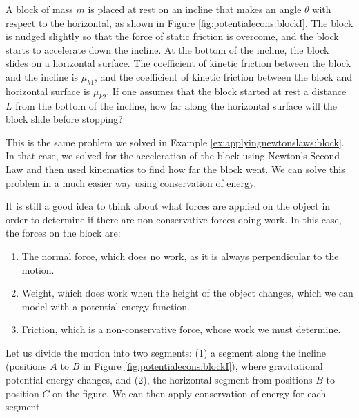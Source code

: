 \begin{example}{\label{ex:potentialecons:blockI}
A block of mass $m$ is placed at rest on an incline that makes an angle $\theta$ with respect to the horizontal, as shown in Figure \ref{fig:potentialecons:blockI}. The block is nudged slightly so that the force of static friction is overcome, and the block starts to accelerate down the incline. At the bottom of the incline, the block slides on a horizontal surface. 
The coefficient of kinetic friction between the block and the incline is $\mu_{k1}$, and the coefficient of kinetic friction between the block and horizontal surface is $\mu_{k2}$. If one assumes that the block started at rest a distance $L$ from the bottom of the incline, how far along the horizontal surface will the block slide before stopping?}

This is the same problem we solved in Example \ref{ex:applyingnewtonslaws:block}. In that case, we solved for the acceleration of the block using Newton's Second Law and then used kinematics to find how far the block went. We can solve this problem in a much easier way using conservation of energy. 

It is still a good idea to think about what forces are applied on the object in order to determine if there are non-conservative forces doing work. In this case, the forces on the block are:
\begin{enumerate}
\item The normal force, which does no work, as it is always perpendicular to the motion.
\item Weight, which does work when the height of the object changes, which we can model with a potential energy function.
\item Friction, which is a non-conservative force, whose work we must determine. 
\end{enumerate}
Let us divide the motion into two segments: (1) a segment along the incline (positions $A$ to $B$ in Figure \ref{fig:potentialecons:blockI}), where gravitational potential energy changes, and (2), the horizontal segment from positions $B$ to position $C$ on the figure. We can then apply conservation of energy for each segment. 


\end{example}
